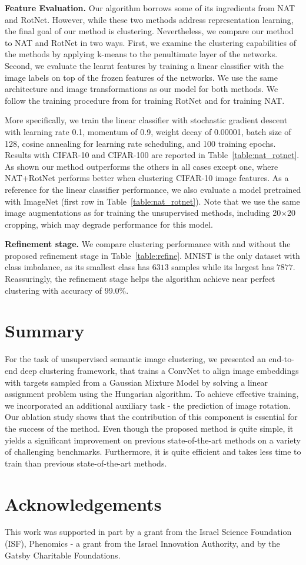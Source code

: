 \documentclass[a4paper,conference]{IEEEtran}
\begin{document}
\textbf{Feature Evaluation.}
Our algorithm borrows some of its ingredients from NAT and RotNet. However, while these two methods address representation learning, the final goal of our method is clustering. Nevertheless, we compare our method to NAT and RotNet in two ways. First, we examine the clustering capabilities of the methods by applying k-means to the penultimate layer of the networks. Second, we evaluate the learnt features by training a linear classifier with the image labels on top of the frozen features of the networks. We use the same architecture and image transformations as our model for both methods. We follow the training procedure from \cite{kolesnikov2019revisiting} for training RotNet and \cite{BJ2017} for training NAT. 

More specifically, we train the linear classifier with stochastic gradient descent with learning rate 0.1, momentum of 0.9, weight decay of 0.00001, batch size of 128, cosine annealing for learning rate scheduling, and 100 training epochs. Results with CIFAR-10 and CIFAR-100 are reported in Table~\ref{table:nat_rotnet}. As shown our method outperforms the others in all cases except one, where NAT+RotNet performs better when clustering CIFAR-10 image features. As a reference for the linear classifier performance, we also evaluate a model pretrained with ImageNet (first row in Table~\ref{table:nat_rotnet}). Note that we use the same image augmentations as for training the unsupervised methods, including 20$\times$20 cropping, which may degrade performance for this model.

\textbf{Refinement stage.} We compare clustering performance with and without the proposed refinement stage in Table~\ref{table:refine}. MNIST is the only dataset with class imbalance, as its smallest class has $6313$ samples while its largest has $7877$. Reassuringly, the refinement stage helps the algorithm achieve near perfect clustering with accuracy of 99.0\%.


\section{Summary}
For the task of unsupervised semantic image clustering, we presented an end-to-end deep clustering framework, that trains a ConvNet to align image embeddings with targets sampled from a Gaussian Mixture Model by solving a linear assignment problem using the Hungarian algorithm. To achieve effective training, we incorporated an additional auxiliary task - the prediction of image rotation. Our ablation study shows that the contribution of this component is essential for the success of the method. Even though the proposed method is quite simple, it yields a significant improvement on previous state-of-the-art methods on a variety of challenging benchmarks. Furthermore, it is quite efficient and takes less time to train than previous state-of-the-art methods.


\section*{Acknowledgements}
This work was supported in part by a grant from the Israel Science Foundation (ISF), Phenomics - a grant from the Israel Innovation Authority, and by the Gatsby Charitable Foundations.



\end{document}
